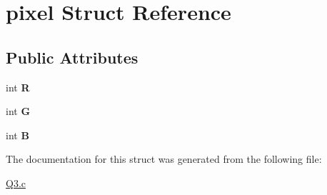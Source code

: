\hypertarget{structpixel}{}\section{pixel Struct Reference}
\label{structpixel}
\subsection*{Public Attributes}
\begin{DoxyCompactItemize}
\item 
\mbox{\label{structpixel_a84007ac12280fbd0399446bc0c9988d8}} 
int {\bfseries R}
\item 
\mbox{\label{structpixel_a6c57ad0173a1f1ae87083f7371c5e93b}} 
int {\bfseries G}
\item 
\mbox{\label{structpixel_aa4a808dd68347c321cdb5d80c9353f6a}} 
int {\bfseries B}
\end{DoxyCompactItemize}


The documentation for this struct was generated from the following file\+:\begin{DoxyCompactItemize}
\item 
\hyperlink{Q3_8c}{Q3.\+c}\end{DoxyCompactItemize}
